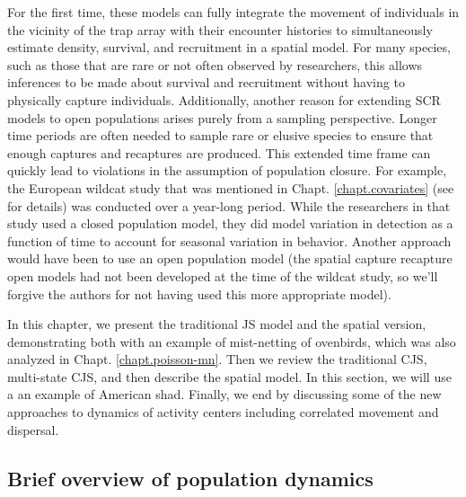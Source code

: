 For the first time, these models can fully
integrate the movement of individuals in the vicinity of the
trap array
with their encounter histories to simultaneously estimate density,
survival, and recruitment in a spatial model.
For many species, such
as those that are rare or not often observed by researchers, this allows
inferences to be made about survival and recruitment without having
to physically capture individuals.
Additionally, another reason for
extending SCR models to open populations arises purely from a
sampling perspective.  Longer time periods are often needed to sample
rare or elusive species to ensure that enough captures and recaptures
are produced.  This extended time frame can quickly lead to violations
in the assumption of population closure.  For example, the European
wildcat study that was mentioned in Chapt. \ref{chapt.covariates} (see
\citet{kery_etal:2011} for details) was
conducted over a year-long period.  While the researchers in that
study used a closed population model, they did model variation in detection
as a function of time to account for seasonal variation in behavior. 
 Another approach would have been to use an
open population model (the spatial capture recapture open models had
not been developed at the time of the wildcat study, so we'll forgive
the authors for not having used this more appropriate model).

In this chapter, we present the traditional JS model and
the spatial version, demonstrating both with an example of mist-netting of ovenbirds,
which was also analyzed in Chapt. \ref{chapt.poisson-mn}.  Then we review the
traditional CJS, multi-state CJS, and then describe the spatial model.  In this
section, we will use a an example of American shad.  Finally, we end by discussing
some of the new approaches to dynamics of activity centers including correlated
movement and dispersal.



\subsection{Brief overview of population dynamics}

